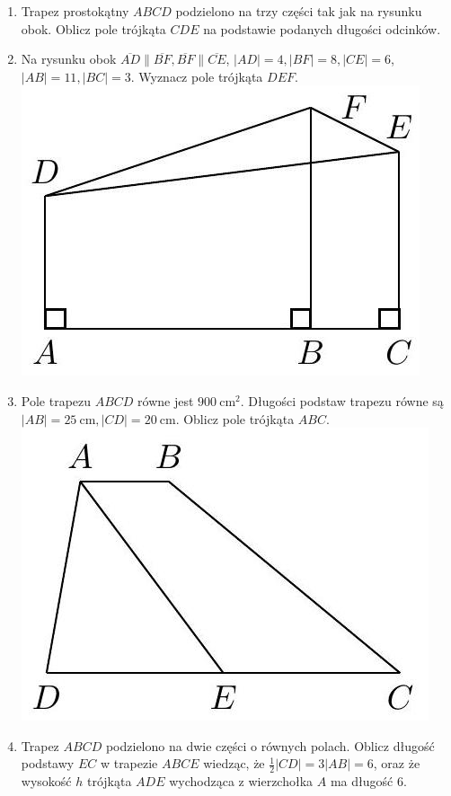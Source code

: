 \documentclass[10pt]{article}
\begin{document}
\begin{enumerate}
  \item Trapez prostokątny \(A B C D\) podzielono na trzy części tak jak na rysunku obok. Oblicz pole trójkąta \(C D E\) na podstawie podanych długości odcinków.
  \item Na rysunku obok \(\overline{A D}\|\overline{B F}, \overline{B F}\| \overline{C E}\), \(|A D|=4,|B F|=8,|C E|=6\), \(|A B|=11,|B C|=3\). Wyznacz pole trójkąta \(D E F\).\\
\includegraphics[max width=\textwidth, center]{2024_11_21_8f01584889ff06348ae7g-201(1)}
  \item Pole trapezu \(A B C D\) równe jest \(900 \mathrm{~cm}^{2}\). Długości podstaw trapezu równe są \(|A B|=25 \mathrm{~cm},|C D|=20 \mathrm{~cm}\). Oblicz pole trójkąta \(A B C\).\\
\includegraphics[max width=\textwidth, center]{2024_11_21_8f01584889ff06348ae7g-201(2)}
  \item Trapez \(A B C D\) podzielono na dwie części o równych polach. Oblicz długość podstawy \(E C\) w trapezie \(A B C E\) wiedząc, że \(\frac{1}{2}|C D|=3|A B|=6\), oraz że wysokość \(h\) trójkąta \(A D E\) wychodząca z wierzchołka \(A\) ma długość 6.
\end{enumerate}
\end{document}
